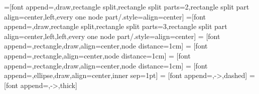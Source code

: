\usepackage[scaled]{beramono}
\usepackage[T1]{fontenc}

\usepackage{tikz}
\usetikzlibrary{shapes}
\usetikzlibrary{positioning}
\usetikzlibrary{calc}
\usetikzlibrary{fit}
\usetikzlibrary{automata}


\makeatletter
{}
\tikzset{anchor/.append code=\let\tikz@auto@anchor\relax}
\makeatother

=[font append=\ttfamily,draw,rectangle split,rectangle split parts=2,rectangle split part align={center,left},every one node part/.style={align=center}]
=[font append=\ttfamily,draw,rectangle split,rectangle split parts=3,rectangle split part align={center,left,left},every one node part/.style={align=center}]
 = [font append=\ttfamily,rectangle,draw,align=center,node distance=1cm]
 = [font append=\ttfamily,rectangle,align=center,node distance=1cm]
 = [font append=\ttfamily,rectangle,draw,align=center,node distance=1cm]
 = [font append=\ttfamily,ellipse,draw,align=center,inner sep=1pt]
 = [font append=\ttfamily,->,dashed]
 = [font append=\ttfamily,->,thick]

\newcommand{\stereotype}[1]{\flqq {#1}\frqq}
